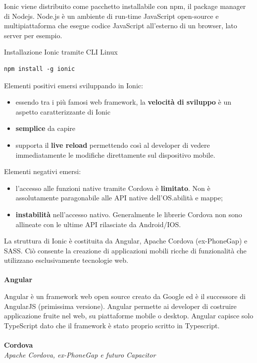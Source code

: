 Ionic viene distribuito come pacchetto installabile con npm, il package manager di Nodejs.
Node.js è un ambiente di run-time JavaScript open-source e multipiattaforma che esegue codice JavaScript all'esterno di un browser, lato server per esempio.

Installazione Ionic tramite CLI Linux
\begin{lstlisting}
npm install -g ionic
\end{lstlisting}

Elementi positivi emersi sviluppando in Ionic:
\begin{itemize}
    \item essendo tra i più famosi web framework, la \textbf{velocità di sviluppo} è un aspetto caratterizzante di Ionic
    \item \textbf{semplice} da capire
    \item supporta il \textbf{live reload} permettendo così al developer di vedere immediatamente le modifiche direttamente sul dispositivo mobile.
\end{itemize}
    
Elementi negativi emersi:
\begin{itemize}
    \item l'accesso alle funzioni native tramite Cordova è \textbf{limitato}. Non è assolutamente paragonabile alle API native dell'OS.abilità e mappe;
    \item \textbf{instabilità} nell'accesso nativo. Generalmente le librerie Cordova non sono allineate con le ultime API rilasciate da Android/IOS.
\end{itemize}

La struttura di Ionic è costituita da Angular, Apache Cordova (ex-PhoneGap) e SASS. Ciò consente la creazione di applicazioni mobili ricche di funzionalità che utilizzano esclusivamente tecnologie web.
\paragraph{}
\textbf{Angular}

Angular è un framework web open source creato da Google ed è il successore di AngularJS (primissima versione).
Angular permette ai developer di costruire applicazione fruite nel web, su piattaforme mobile o desktop. 
Angular capisce solo TypeScript dato che il framework è stato proprio scritto in Typescript. 

\paragraph{}
\textbf{Cordova}\\
\textit{Apache Cordova, ex-PhoneGap e futuro Capacitor}

